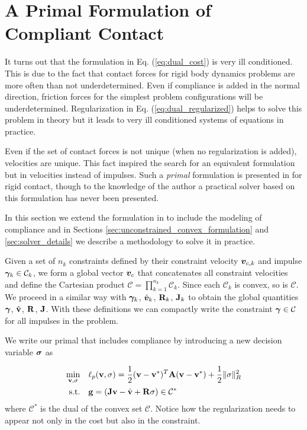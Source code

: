 
\section{A Primal Formulation of Compliant Contact}


It turns out that the formulation in Eq. (\ref{eq:dual_cost}) is very ill
conditioned. This is due to the fact that contact forces for rigid body dynamics
problems are more often than not underdetermined. Even if compliance is added in
the normal direction, friction forces for the simplest problem configurations
will be underdetermined. Regularization in Eq. (\ref{eq:dual_regularized}) helps
to solve this problem in theory but it leads to very ill conditioned systems of
equations in practice. 

Even if the set of contact forces is not unique (when no regularization is
added), velocities are unique. This fact inspired the search for an equivalent
formulation but in velocities instead of impulses. Such a \textit{primal}
formulation is presented in \cite{bib:mazhar2014} for rigid contact, though to
the knowledge of the author a practical solver based on this formulation has
never been presented.

In this section we extend the formulation in \cite{bib:mazhar2014} to include
the modeling of compliance and in Sections
\ref{sec:unconstrained_convex_formulation} and \ref{sec:solver_details} we
describe a methodology to solve it in practice.

Given a set of $n_k$ constraints defined by their constraint velocity
${\bm{v}}_{c,k}$ and impulse ${\bm\gamma}_k\in\mathcal{C}_k$, we form a global vector
${\bm{v}}_c$ that concatenates all constraint velocities and define the Cartesian
product $\mathcal{C}=\prod_{k=1}^{n_k}\mathcal{C}_k$. Since each $\mathcal{C}_k$
is convex, so is $\mathcal{C}$. We proceed in a similar way with ${\bm\gamma}_k$,
$\hat{{\bm{v}}}_k$, ${\mathbf{R}}_k$, ${\mathbf{J}}_k$ to obtain the global quantities
${\bm\gamma}$, $\hat{{\mathbf{v}}}$, ${\mathbf{R}}$, ${\mathbf{J}}$. With these definitions we can
compactly write the constraint ${\bm\gamma}\in\mathcal{C}$ for all impulses in the
problem.

We write our primal that includes compliance by introducing a new decision
variable ${\bm{\sigma}}$ as

\begin{equation}
	\begin{aligned}
	\min_{\mf{v},\mf{\sigma}} \quad & \ell_p(\mf{v},\mf{\sigma}) = \frac{1}{2}(\mf{v}-\mf{v}^*)^T\mf{A}(\mf{v}-\mf{v}^*) + \frac{1}{2} \Vert\mf\sigma\Vert_{R}^2\\
	\textrm{s.t.} \quad & \mf{g} = (\mf{J}\mf{v}-\hat{\mf{v}} + \mf{R}\mf\sigma) \in \mathcal{C}^*\\
	\end{aligned}
	\label{eq:primal_regularized}
\end{equation}
where $\mathcal{C}^*$ is the dual of the convex set $\mathcal{C}$. Notice how
the regularization needs to appear not only in the cost but also in the
constraint. 

